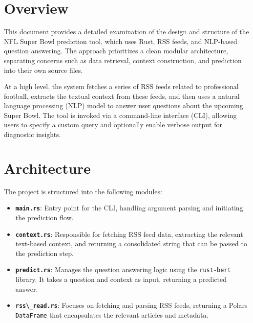 

%
%

\newcommand{\hmwkTitle}{Final Project Design}
\newcommand{\hmwkDueDate}{December 16, 2024}
\newcommand{\hmwkDueTime}{11:59 PM}
\newcommand{\hmwkClass}{ENAE 380}
\newcommand{\hmwkClassTime}{0106}
\newcommand{\hmwkClassInstructor}{Dr. Mumu Xu}
\newcommand{\hmwkAuthorName}{\textbf{Vai Srivastava}}
\newcommand{\hmwkCompletionDate}{\today}



\maketitle

\pagebreak

\section{Overview}
This document provides a detailed examination of the design and structure of the NFL Super Bowl prediction tool, which uses Rust, RSS feeds, and NLP-based question answering. The approach prioritizes a clean modular architecture, separating concerns such as data retrieval, context construction, and prediction into their own source files.

At a high level, the system fetches a series of RSS feeds related to professional football, extracts the textual context from these feeds, and then uses a natural language processing (NLP) model to answer user questions about the upcoming Super Bowl. The tool is invoked via a command-line interface (CLI), allowing users to specify a custom query and optionally enable verbose output for diagnostic insights.

\section{Architecture}
The project is structured into the following modules:

\begin{itemize}
    \item \textbf{\lstinline{main.rs}}: Entry point for the CLI, handling argument parsing and initiating the prediction flow.
    \item \textbf{\lstinline{context.rs}}: Responsible for fetching RSS feed data, extracting the relevant text-based context, and returning a consolidated string that can be passed to the prediction step.
    \item \textbf{\lstinline{predict.rs}}: Manages the question answering logic using the \lstinline{rust-bert} library. It takes a question and context as input, returning a predicted answer.
    \item \textbf{\lstinline{rss\_read.rs}}: Focuses on fetching and parsing RSS feeds, returning a Polars \lstinline{DataFrame} that encapsulates the relevant articles and metadata.
\end{itemize}

